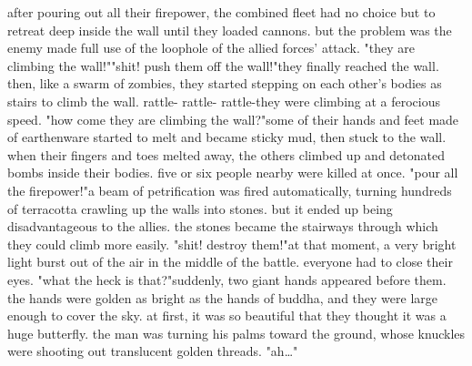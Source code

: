 after pouring out all their firepower, the combined fleet had no choice but to retreat deep inside the wall until they loaded cannons.
but the problem was the enemy made full use of the loophole of the allied forces' attack.
"they are climbing the wall!""shit! push them off the wall!"they finally reached the wall.
 then, like a swarm of zombies, they started stepping on each other's bodies as stairs to climb the wall.
rattle- rattle- rattle-they were climbing at a ferocious speed.
 "how come they are climbing the wall?"some of their hands and feet made of earthenware started to melt and became sticky mud, then stuck to the wall.
 when their fingers and toes melted away, the others climbed up and detonated bombs inside their bodies.
 five or six people nearby were killed at once.
"pour all the firepower!"a beam of petrification was fired automatically, turning hundreds of terracotta crawling up the walls into stones.
 but it ended up being disadvantageous to the allies.
 the stones became the stairways through which they could climb more easily.
"shit! destroy them!"at that moment, a very bright light burst out of the air in the middle of the battle.
 everyone had to close their eyes.
"what the heck is that?"suddenly, two giant hands appeared before them.
 the hands were golden as bright as the hands of buddha, and they were large enough to cover the sky.
 at first, it was so beautiful that they thought it was a huge butterfly.
the man was turning his palms toward the ground, whose knuckles were shooting out translucent golden threads.
 "ah…"

 